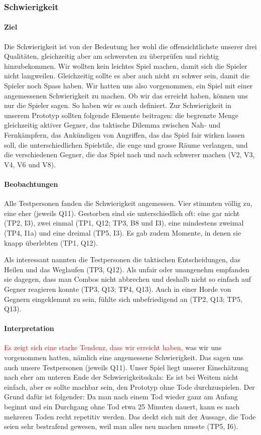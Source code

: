 \documentclass[../Main.tex]{subfiles}
\begin{document}
\subsubsection{Schwierigkeit}

\paragraph{Ziel}
Die Schwierigkeit ist von der Bedeutung her wohl die offensichtlichste unserer drei Qualitäten, gleichzeitig aber am schwersten zu überprüfen und richtig hinzubekommen. Wir wollten kein leichtes Spiel machen, damit sich die Spieler nicht langweilen. Gleichzeitig sollte es aber auch nicht zu schwer sein, damit die Spieler noch Spass haben. Wir hatten uns also vorgenommen, ein Spiel mit einer angemessenen Schwierigkeit zu machen. Ob wir das erreicht haben, können uns nur die Spieler sagen. So haben wir es auch definiert. Zur Schwierigkeit in unserem Prototyp sollten folgende Elemente beitragen: die begrenzte Menge gleichzeitig aktiver Gegner, das taktische Dilemma zwischen Nah- und Fernkämpfern, das Ankündigen von Angriffen, das das Spiel fair wirken lassen soll, die unterschiedlichen Spielstile, die enge und grosse Räume verlangen, und die verschiedenen Gegner, die das Spiel nach und nach schwerer machen (V2, V3, V4, V6 und V8).

\paragraph{Beobachtungen}
Alle Testpersonen fanden die Schwierigkeit angemessen. Vier stimmten völlig zu, eine eher (jeweils Q11). Gestorben sind sie unterschiedlich oft: eine gar nicht (TP2, I3), zwei einmal (TP1, Q12; TP3, B8 und I3), eine mindestens zweimal (TP4, I1a) und eine dreimal (TP5, I3). Es gab zudem Momente, in denen sie knapp überlebten (TP1, Q12).

Als interessant nannten die Testpersonen die taktischen Entscheidungen, das Heilen und das Weglaufen (TP3, Q12). Als unfair oder unangenehm empfanden sie dagegen, dass man Combos nicht abbrechen und deshalb nicht so einfach auf Gegner reagieren konnte (TP3, Q13; TP4, Q13). Auch in einer Horde von Gegnern eingeklemmt zu sein, fühlte sich unbefriedigend an (TP2, Q13; TP5, Q13).

\paragraph{Interpretation}
\textcolor{red}{Es zeigt sich eine starke Tendenz, dass wir erreicht haben,} was wir uns vorgenommen hatten, nämlich eine angemessene Schwierigkeit. Das sagen uns auch unsere Testpersonen (jeweils Q11). Unser Spiel liegt unserer Einschätzung nach eher am unteren Ende der Schwierigkeitsskala: Es ist bei Weitem nicht einfach, aber es sollte machbar sein, den Prototyp ohne Tode durchzuspielen. Der Grund dafür ist folgender: Da man nach einem Tod wieder ganz am Anfang beginnt und ein Durchgang ohne Tod etwa 25 Minuten dauert, kann es nach mehreren Toden recht repetitiv werden. Das deckt sich mit der Aussage, die Tode seien sehr bestrafend gewesen, weil man alles neu machen musste (TP5, I6).
\end{document}
